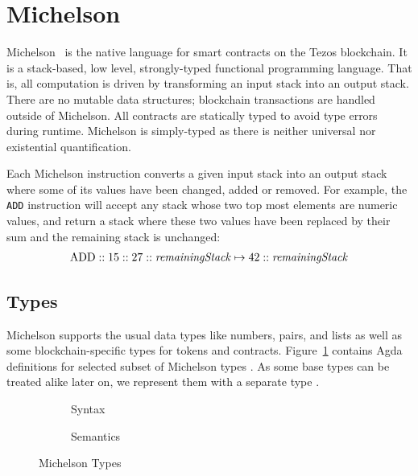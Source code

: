\section{Michelson}
\label{sec:michelson}
\label{sec:Mtype}


Michelson~\cite{Mref,devres} is the native language for smart contracts on the Tezos blockchain.
It is a stack-based, low level, strongly-typed functional programming
language. That is, all computation is driven by transforming an input
stack into an output stack. There are no mutable data structures;
blockchain transactions are handled outside of Michelson.
All contracts are statically typed to avoid type errors during runtime.
Michelson is simply-typed as there is neither universal nor
existential quantification.

Each Michelson instruction converts a given input stack into an output stack
where some of its values have been changed, added or removed.
For example, the \verb=ADD= instruction will accept any stack
whose two top most elements are numeric values,
and return a stack where these two values have been replaced by their sum
and the remaining stack is unchanged:
\begin{align*}
	\text{ADD} :: 15 :: 27 :: \text{\emph{remainingStack}}
	\mapsto	           42 :: \text{\emph{remainingStack}}
\label{equ:ADD}
\end{align*}

\subsection{Types}
\label{sec:michelson-types}

Michelson supports the usual data types like numbers, pairs, and lists as well as
some blockchain-specific types for tokens and contracts. 
Figure~\ref{fig:Type} contains Agda definitions for selected subset of
Michelson types {\AType}. As some base types can be treated alike later on, we
represent them with a separate type {\ABaseType}.

\begin{figure}[tp]
  \begin{subfigure}{0.48\textwidth}
    \noindent
    \TypesType
    \TypesPatterns
    \caption{Syntax}
    \label{fig:Type}
  \end{subfigure}
  \begin{subfigure}{0.48\textwidth}
  \TypesSemantics
  \caption{Semantics}
  \label{fig:Type-Semantics}
\end{subfigure}
\caption{Michelson Types}
\label{Type}
\end{figure}

